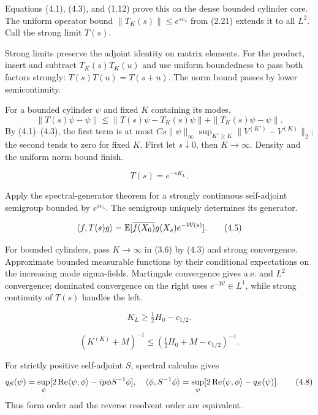\documentclass[11pt,a4paper]{article}
\begin{document}

\Because Equations (4.1), (4.3), and (1.12) prove this on the dense bounded
cylinder core.  The uniform operator bound
$\|T_K(s)\|\le e^{sc_\lambda}$ from (2.21) extends it to all $L^2$.
Call the strong limit $T(s)$.


\Because Strong limits preserve the adjoint identity on matrix elements.
For the product, insert and subtract
$T_K(s)T_K(u)$ and use uniform boundedness to pass both factors strongly:
$T(s)T(u)=T(s+u)$.  The norm bound passes by lower semicontinuity.


\Because For a bounded cylinder $\psi$ and fixed $K$ containing its modes,
\[
 \|T(s)\psi-\psi\|
 \le\|T(s)\psi-T_K(s)\psi\|+\|T_K(s)\psi-\psi\|.
\]
By (4.1)--(4.3), the first term is at most
$Cs\|\psi\|_\infty\sup_{K'\ge K}\|V^{(K')}-V^{(K)}\|_2$; the second
tends to zero for fixed $K$.  First let $s\downarrow0$, then $K\to\infty$.
Density and the uniform norm bound finish.

\[
 T(s)=e^{-sK_L}.
\tag{4.4}
\]

\Because Apply the spectral-generator theorem for a strongly continuous
self-adjoint semigroup bounded by $e^{sc_\lambda}$.  The semigroup uniquely
determines its generator.

\[
 \langle f,T(s)g\rangle=\mathbb E[\overline{f(X_0)}g(X_s)e^{-\mathcal W(s)}].
\tag{4.5}
\]

\Because For bounded cylinders, pass $K\to\infty$ in (3.6) by (4.3) and
strong convergence.  Approximate bounded measurable functions by their conditional
expectations on the increasing mode sigma-fields.  Martingale convergence gives
a.e. and $L^2$ convergence; dominated convergence on the right uses
$e^{-\mathcal W}\in L^1$, while strong continuity of $T(s)$ handles the left.

\[
 K_L\ge\tfrac12H_0-c_{1/2}.
\tag{4.6}
\]

\[
 (K^{(K)}+M)^{-1}\le
 (\tfrac12H_0+M-c_{1/2})^{-1}.
\tag{4.7}
\]

\Because For strictly positive self-adjoint $S$, spectral calculus gives
\[
 q_S(\psi)=\sup_\phi[2\operatorname{Re}\langle \psi,\phi\rangle-ip\phi{S^{-1}\phi}],
\quad
 \langle \phi,S^{-1}\phi\rangle=\sup_\psi[2\operatorname{Re}\langle \psi,\phi\rangle-q_S(\psi)].
\tag{4.8}
\]
Thus form order and the reverse resolvent order are equivalent.
\end{document}
